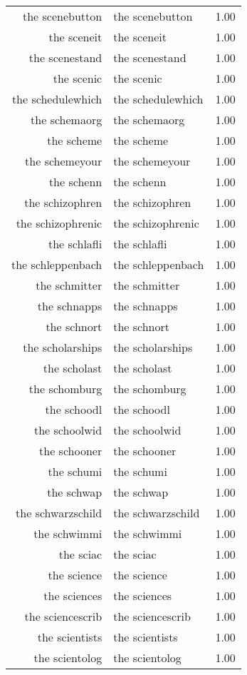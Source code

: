 \begin{table}[ht]
\begin{tabular}{rlr}
  the scenebutton & the scenebutton & 1.00 \\ 
  the sceneit & the sceneit & 1.00 \\ 
  the scenestand & the scenestand & 1.00 \\ 
  the scenic & the scenic & 1.00 \\ 
  the schedulewhich & the schedulewhich & 1.00 \\ 
  the schemaorg & the schemaorg & 1.00 \\ 
  the scheme & the scheme & 1.00 \\ 
  the schemeyour & the schemeyour & 1.00 \\ 
  the schenn & the schenn & 1.00 \\ 
  the schizophren & the schizophren & 1.00 \\ 
  the schizophrenic & the schizophrenic & 1.00 \\ 
  the schlafli & the schlafli & 1.00 \\ 
  the schleppenbach & the schleppenbach & 1.00 \\ 
  the schmitter & the schmitter & 1.00 \\ 
  the schnapps & the schnapps & 1.00 \\ 
  the schnort & the schnort & 1.00 \\ 
  the scholarships & the scholarships & 1.00 \\ 
  the scholast & the scholast & 1.00 \\ 
  the schomburg & the schomburg & 1.00 \\ 
  the schoodl & the schoodl & 1.00 \\ 
  the schoolwid & the schoolwid & 1.00 \\ 
  the schooner & the schooner & 1.00 \\ 
  the schumi & the schumi & 1.00 \\ 
  the schwap & the schwap & 1.00 \\ 
  the schwarzschild & the schwarzschild & 1.00 \\ 
  the schwimmi & the schwimmi & 1.00 \\ 
  the sciac & the sciac & 1.00 \\ 
  the science & the science & 1.00 \\ 
  the sciences & the sciences & 1.00 \\ 
  the sciencescrib & the sciencescrib & 1.00 \\ 
  the scientists & the scientists & 1.00 \\ 
  the scientolog & the scientolog & 1.00 \\ 

\end{tabular}
\end{table}
